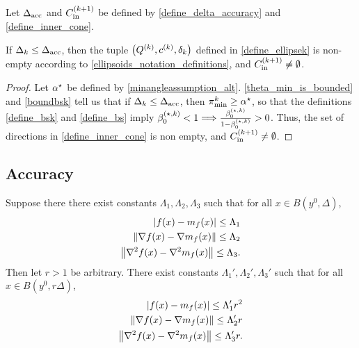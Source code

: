 \begin{lemma}
\label{sampletrk_is_nonempty}
Let ${\Delta_{\textrm{acc}}}$ and ${C^{(k+1)}_{\textrm{in}}}$ be defined by \cref{define_delta_accuracy} and \cref{define_inner_cone}.



If $\Delta_k \le {\Delta_{\textrm{acc}}}$, then the tuple $\left({Q^{(k)}}, {c^{(k)}}, {\delta_k}\right)$ defined in \cref{define_ellipsek}
is non-empty according to \cref{ellipsoids_notation_definitions}, and ${C^{(k+1)}_{\textrm{in}}} \ne \emptyset$.
\end{lemma}
\begin{proof}
Let ${ \alpha^{\star} }$ be defined by \cref{minangleassumption_alt}.
\cref{theta_min_is_bounded} and \cref{boundbsk} tell us that 
if $\Delta_k \le {\Delta_{\textrm{acc}}}$, then ${\pi^k_{\textrm{min}}} \ge { \alpha^{\star} }$, 
so that the definitions \cref{define_bsk} and \cref{define_bs} imply
${\beta_0^{(\star, k)}} < 1 \Longrightarrow \frac{{\beta_0^{(\star, k)}}}{1 - {\beta_0^{(\star, k)}}} > 0$.
Thus, the set of directions in \cref{define_inner_cone} is non empty, and
${C^{(k+1)}_{\textrm{in}}} \ne \emptyset$.
\end{proof}


\subsection{Accuracy}
\label{accuracy_section}


\begin{lemma}
\label{change_radius} 




Suppose there there exist constants $\Lambda_1, \Lambda_2, \Lambda_3$ such that for all $x \in B\left(y^0, \Delta\right)$,
\begin{align*}
\left|f(x) - m_f(x)\right| \le \Lambda_1 \\ %
\left\|\gradf(x) - \nabla m_f(x)\right\| \le \Lambda_2 \\ %
\left\|\nabla^2 f(x) - \nabla^2 m_f(x)\right\| \le \Lambda_3. %
\end{align*}
Then let $r > 1$ be arbitrary.
There exist constants $\Lambda_1', \Lambda_2', \Lambda_3'$ such that for all $x \in B\left(y^0, r\Delta\right)$,
\begin{align*}
\left|f(x) - m_f(x)\right| \le \Lambda_1' r^2 \\ %
\left\|\gradf(x) - \nabla m_f(x)\right\| \le \Lambda_2' r\\ %
\left\|\nabla^2 f(x) - \nabla^2 m_f(x)\right\| \le \Lambda_3' r .%
\end{align*}
\end{lemma}

